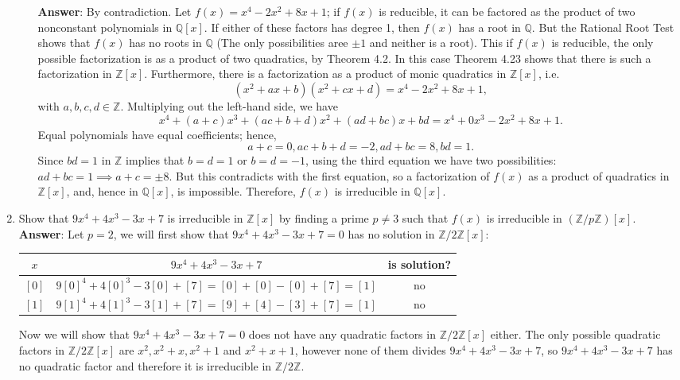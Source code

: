 \documentclass{article}
\begin{document}
\begin{enumerate}
\begin{enumerate}
                        \textbf{Answer}: By contradiction. Let $f(x)=x^4-2x^2+8x+1$; if $f(x)$ is reducible, it can be factored as the product of two nonconstant polynomials in $\mathbb{Q}[x]$. If either of these factors has degree 1, then $f(x)$ has a root in $\mathbb{Q}$. But the Rational Root Test shows that $f(x)$ has no roots in $\mathbb{Q}$ (The only possibilities aree $\pm 1$ and neither is a root). This if $f(x)$ is reducible, the only possible factorization is as a product of two quadratics, by Theorem 4.2. In this case Theorem 4.23 shows that there is such a factorization in $\mathbb{Z}[x]$. Furthermore, there is a factorization as a product of monic quadratics in $\mathbb{Z}[x]$, i.e. \[(x^2+ax+b)(x^2+cx+d)=x^4-2x^2+8x+1,\] with $a,b,c,d\in\mathbb{Z}$. Multiplying out the left-hand side, we have \[x^4+(a+c)x^3+(ac+b+d)x^2+(ad+bc)x+bd=x^4+0x^3-2x^2+8x+1.\] Equal polynomials have equal coefficients; hence, \[a+c=0,ac+b+d=-2,ad+bc=8,bd=1.\] Since $bd=1$ in $\mathbb{Z}$ implies that $b=d=1$ or $b=d=-1$, using the third equation we have two possibilities: $ad+bc=1\implies a+c=\pm 8$. But this contradicts with the first equation, so a factorization of $f(x)$ as a product of quadratics in $\mathbb{Z}[x]$, and, hence in $\mathbb{Q}[x]$, is impossible. Therefore, $f(x)$ is irreducible in $\mathbb{Q}[x]$.
            \end{enumerate}
      \item Show that $9x^4+4x^3-3x+7$ is irreducible in $\mathbb{Z}[x]$ by finding a prime $p\neq 3$ such that $f(x)$ is irreducible in $(\mathbb{Z}/p\mathbb{Z})[x]$.\\
            \textbf{Answer}: Let $p=2$, we will first show that $9x^4+4x^3-3x+7=0$ has no solution in $\mathbb{Z}/2\mathbb{Z}[x]$:
            \begin{center}
                  \begin{tabular}{c|c|c}
                        $x$   & $9x^4+4x^3-3x+7$                             & is solution? \\
                        \hline
                        $[0]$ & $9[0]^4+4[0]^3-3[0]+[7]=[0]+[0]-[0]+[7]=[1]$ & no           \\
                        $[1]$ & $9[1]^4+4[1]^3-3[1]+[7]=[9]+[4]-[3]+[7]=[1]$ & no
                  \end{tabular}
            \end{center}
            Now we will show that $9x^4+4x^3-3x+7=0$ does not have any quadratic factors in $\mathbb{Z}/2\mathbb{Z}[x]$ either. The only possible quadratic factors in $\mathbb{Z}/2\mathbb{Z}[x]$ are $x^2,x^2+x,x^2+1$ and $x^2+x+1$, however none of them divides $9x^4+4x^3-3x+7$, so $9x^4+4x^3-3x+7$ has no quadratic factor and therefore it is irreducible in $\mathbb{Z}/2\mathbb{Z}$.

\end{enumerate}
\end{document}
